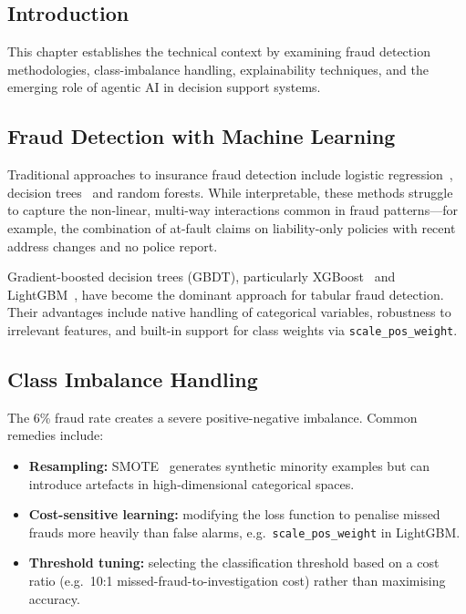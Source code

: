 \documentclass[12pt,a4paper]{article}
\begin{document}
\subsection{Introduction}

This chapter establishes the technical context by examining fraud detection methodologies, class-imbalance handling, explainability techniques, and the emerging role of agentic AI in decision support systems.

\subsection{Fraud Detection with Machine Learning}

Traditional approaches to insurance fraud detection include logistic regression~\cite{ref:bolton2002}, decision trees~\cite{ref:phua2010} and random forests.  While interpretable, these methods struggle to capture the non-linear, multi-way interactions common in fraud patterns---for example, the combination of at-fault claims on liability-only policies with recent address changes and no police report.

Gradient-boosted decision trees (GBDT), particularly XGBoost~\cite{ref:chen2016} and LightGBM~\cite{ref:ke2017}, have become the dominant approach for tabular fraud detection.  Their advantages include native handling of categorical variables, robustness to irrelevant features, and built-in support for class weights via \texttt{scale\_pos\_weight}.

\subsection{Class Imbalance Handling}

The 6\% fraud rate creates a severe positive-negative imbalance.  Common remedies include:

\begin{itemize}
    \item \textbf{Resampling:} SMOTE~\cite{ref:chawla2002} generates synthetic minority examples but can introduce artefacts in high-dimensional categorical spaces.
    \item \textbf{Cost-sensitive learning:} modifying the loss function to penalise missed frauds more heavily than false alarms, e.g.\ \texttt{scale\_pos\_weight} in LightGBM.
    \item \textbf{Threshold tuning:} selecting the classification threshold based on a cost ratio (e.g.\ 10:1 missed-fraud-to-investigation cost) rather than maximising accuracy.
\end{itemize}
\end{document}

